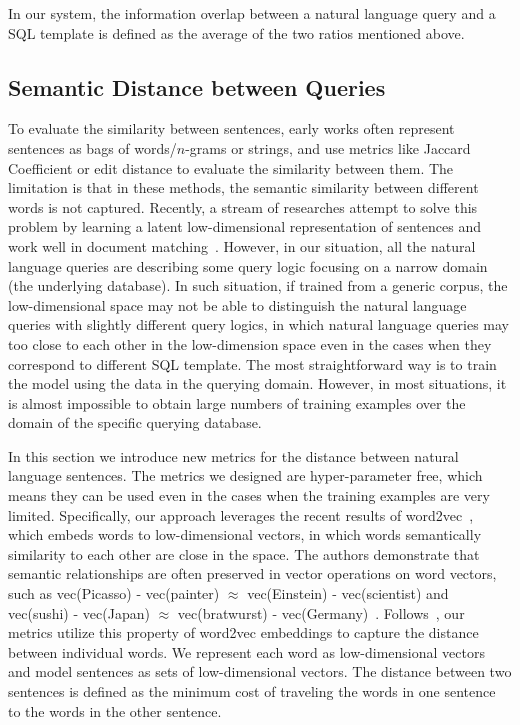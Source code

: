\documentclass{vldb}
\begin{document}
In our system, the information overlap between a natural language query and a SQL template is defined as the average of the two ratios mentioned above. 

\subsection{Semantic Distance between Queries}
\label{subsec:training}
To evaluate the similarity between sentences, early works often represent sentences as bags of words/$n$-grams or strings, and use metrics like Jaccard Coefficient or edit distance to evaluate the similarity between them.  The limitation is that in these methods, the semantic similarity between different words is not captured.  Recently, a stream of researches attempt to solve this problem by learning a latent low-dimensional representation of sentences and work well in document matching~\cite{DBLP:conf/icml/LeM14}.  However, in our situation, all the natural language queries are describing some query logic focusing on a narrow domain (the underlying database).  In such situation, if trained from a generic corpus, the low-dimensional space may not be able to distinguish the natural language queries with slightly different query logics, in which natural language queries may too close to each other in the low-dimension space even in the cases when they correspond to different SQL template.  The most straightforward  way is to train the model using the data in the querying domain.  However, in most situations, it is almost impossible to obtain large numbers of training examples over the domain of the specific querying database.  

In this section we introduce new metrics for the distance between natural language sentences.  The metrics we designed are hyper-parameter free, which means they can be used even in the cases when the training examples are very limited.  Specifically, our approach leverages the recent results of word2vec~\cite{DBLP:conf/nips/MikolovSCCD13}, which embeds words to low-dimensional vectors, in which words semantically similarity to each other are close in the space.  The authors demonstrate that semantic relationships are often preserved in vector operations on word vectors, such as vec(Picasso) - vec(painter) $\approx$ vec(Einstein) - vec(scientist) and vec(sushi) - vec(Japan)  $\approx$ vec(bratwurst) - vec(Germany)~\cite{DBLP:conf/nips/MikolovSCCD13}.  Follows~\cite{DBLP:conf/icml/KusnerGGW15}, our metrics utilize this property of word2vec embeddings to capture the distance between individual words.  We represent each word as low-dimensional vectors and model sentences as sets of low-dimensional vectors.  The distance between two sentences is defined as the minimum cost of traveling the words in one sentence to the words in the other sentence.  
\end{document}

